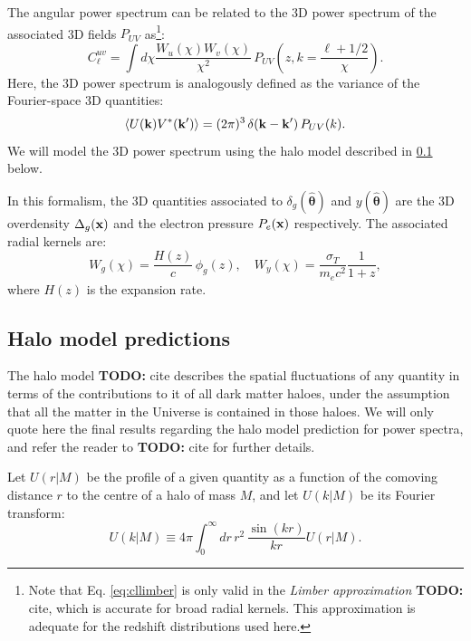\documentclass[useAMS,usenatbib]{mn2e}
\newcommand{\nv}{\hat{\boldsymbol{\theta}}}
\newcommand{\TODO}[1]{{\bf TODO:} #1}
\newcommand{\todo}[1]{{\bf TODO:} #1}
\begin{document}
    The angular power spectrum can be related to the 3D power spectrum of the associated 3D fields $P_{UV}$ as\footnote{Note that Eq. \ref{eq:cllimber} is only valid in the {\sl Limber approximation} \todo{cite}, which is accurate for broad radial kernels. This approximation is adequate for the redshift distributions used here.}:
    \begin{equation}\label{eq:cllimber}
      C_\ell^{uv} = \int d\chi \frac{W_u(\chi)W_v(\chi)}{\chi^2}\,P_{UV}\left( z, k=\frac{\ell+1/2}{\chi} \right).
    \end{equation}
    Here, the 3D power spectrum is analogously defined as the variance of the Fourier-space 3D quantities:
    \begin{equation}
      \left\langle U({\bf k})V^*({\bf k}')\right\rangle = (2\pi)^3\,\delta({\bf k}-{\bf k}')\,P_{UV}(k).
    \end{equation}
    We will model the 3D power spectrum using the halo model described in \ref{ssec:theory.hm} below.

    In this formalism, the 3D quantities associated to $\delta_g(\nv)$ and $y(\nv)$ are the 3D overdensity $\Delta_g({\bf x})$ and the electron pressure $P_e({\bf x})$ respectively. The associated radial kernels are:
    \begin{equation}
      W_g(\chi)=\frac{H(z)}{c}\,\phi_g(z),\hspace{12pt}W_y(\chi)=\frac{\sigma_T}{m_ec^2}\frac{1}{1+z},
    \end{equation}
    where $H(z)$ is the expansion rate.

  \subsection{Halo model predictions}\label{ssec:theory.hm}
    The halo model \TODO{cite} describes the spatial fluctuations of any quantity in terms of the contributions to it of all dark matter haloes, under the assumption that all the matter in the Universe is contained in those haloes. We will only quote here the final results regarding the halo model prediction for power spectra, and refer the reader to \TODO{cite} for further details.
    
    Let $U(r|M)$ be the profile of a given quantity as a function of the comoving distance $r$ to the centre of a halo of mass $M$, and let $U(k|M)$ be its Fourier transform:
    \begin{equation}
      U(k|M)\equiv4\pi \int_0^\infty dr\,r^2\,\frac{\sin(kr)}{kr}U(r|M).
    \end{equation}
\end{document}

